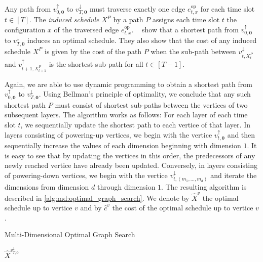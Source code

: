 Any path from $v_{0,\mathbf{0}}^{\uparrow}$ to $v_{T,\mathbf{0}}^{\downarrow}$ must traverse exactly one edge $e_{t,x}^{\text{op}}$ for each time slot $t \in [T]$. The \emph{induced schedule} $X^P$ by a path $P$ assigns each time slot $t$ the configuration $x$ of the traversed edge $e_{t,x}^{\text{op}}$. \citeauthor*{Albers2021_2}~\cite{Albers2021_2} show that a shortest path from $v_{0,\mathbf{0}}^{\uparrow}$ to $v_{T,\mathbf{0}}^{\downarrow}$ induces an optimal schedule. They also show that the cost of any induced schedule $X^P$ is given by the cost of the path $P$ when the sub-path between $v_{t,X_t^P}^{\downarrow}$ and $v_{t+1,X_{t+1}^P}^{\uparrow}$ is the shortest sub-path for all $t \in [T-1]$.

Again, we are able to use dynamic programming to obtain a shortest path from $v_{0,\mathbf{0}}^{\uparrow}$ to $v_{T,\mathbf{0}}^{\downarrow}$. Using Bellman's principle of optimality, we conclude that any such shortest path $P$ must consist of shortest sub-paths between the vertices of two subsequent layers. The algorithm works as follows: For each layer of each time slot $t$, we sequentially update the shortest path to each vertice of that layer. In layers consisting of powering-up vertices, we begin with the vertice $v_{t,\mathbf{0}}^{\uparrow}$ and then sequentially increase the values of each dimension beginning with dimension $1$. It is easy to see that by updating the vertices in this order, the predecessors of any newly reached vertice have already been updated. Conversely, in layers consisting of powering-down vertices, we begin with the vertice $v_{t,(m_1,\dots,m_d)}^{\downarrow}$ and iterate the dimensions from dimension $d$ through dimension $1$. The resulting algorithm is described in \cref{alg:md:optimal_graph_search}. We denote by $\hat{X}^v$ the optimal schedule up to vertice $v$ and by $\hat{c}^v$ the cost of the optimal schedule up to vertice $v$.

\begin{algorithm}
    \caption{Multi-Dimensional Optimal Graph Search~\cite{Albers2021_2}}\label{alg:md:optimal_graph_search}
    \Return $\hat{X}^{v_{T,\mathbf{0}}^{\downarrow}}$\;
\end{algorithm}

